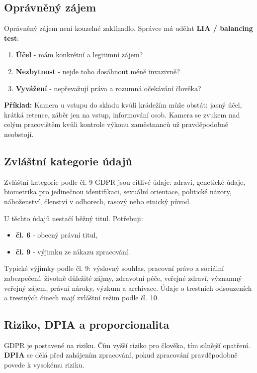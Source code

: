 \documentclass[11pt,a4paper]{article}
\newcommand{\priklad}[1]{\begin{tcolorbox}[breakable,enhanced,colback=green!7,colframe=green!30!black,boxrule=0pt,arc=1mm,left=5pt,right=5pt,top=5pt,bottom=5pt,before skip=6pt,after skip=6pt]\textbf{Příklad:} #1\end{tcolorbox}}
\begin{document}
\subsection*{Oprávněný zájem}
Oprávněný zájem není kouzelné zaklínadlo. Správce má udělat \textbf{LIA / balancing test}:
\begin{enumerate}
  \item \textbf{Účel} - mám konkrétní a legitimní zájem?
  \item \textbf{Nezbytnost} - nejde toho dosáhnout méně invazivně?
  \item \textbf{Vyvážení} - nepřevažují práva a rozumná očekávání člověka?
\end{enumerate}

\priklad{Kamera u vstupu do skladu kvůli krádežím může obstát: jasný účel, krátká retence, záběr jen na vstup, informování osob. Kamera se zvukem nad celým pracovištěm kvůli kontrole výkonu zaměstnanců už pravděpodobně neobstojí.}

\subsection*{Zvláštní kategorie údajů}
Zvláštní kategorie podle čl. 9 GDPR jsou citlivé údaje: zdraví, genetické údaje, biometrika pro jedinečnou identifikaci, sexuální orientace, politické názory, náboženství, členství v odborech, rasový nebo etnický původ.

U těchto údajů nestačí běžný titul. Potřebuji:
\begin{itemize}
  \item \textbf{čl. 6} - obecný právní titul,
  \item \textbf{čl. 9} - výjimku ze zákazu zpracování.
\end{itemize}

Typické výjimky podle čl. 9: výslovný souhlas, pracovní právo a sociální zabezpečení, životně důležité zájmy, zdravotní péče, veřejné zdraví, významný veřejný zájem, právní nároky, výzkum a archivace. Údaje o trestních odsouzeních a trestných činech mají zvláštní režim podle čl. 10.

\subsection*{Riziko, DPIA a proporcionalita}
GDPR je postavené na riziku. Čím vyšší riziko pro člověka, tím silnější opatření. \textbf{DPIA} se dělá před zahájením zpracování, pokud zpracování pravděpodobně povede k vysokému riziku.
\end{document}

